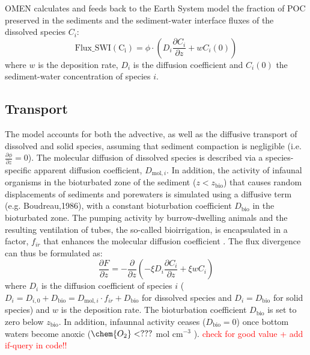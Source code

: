\documentclass[gmd, manuscript]{copernicus}
\begin{document}
OMEN calculates and feeds back to the Earth System model the fraction of POC preserved in the sediments and the sediment-water interface fluxes of the dissolved species $C_i$:
\begin{equation}
\mathrm{Flux\_SWI(C_i)} = \phi \cdot \left(D_i \frac{\partial C_i}{\partial z} + w C_i(0) \right)
\end{equation}
where $w$ is the deposition rate, $D_i$ is the diffusion coefficient and $C_i(0)$ the sediment-water concentration of species $i$. 

\subsection{Transport}\label{subsec:Transport}
The model accounts for both the advective, as well as the diffusive transport of dissolved and solid species, assuming that sediment compaction is negligible (i.e. $\frac{\partial \phi}{\partial z}=0$). 
The molecular diffusion of dissolved species is described via a species-specific apparent diffusion coefficient, $D_{\mathrm{mol},i}$. 
In addition, the activity of infaunal organisms in the bioturbated zone of the sediment ($z<z_{\mathrm{bio}}$) that causes random 
displacements of sediments and porewaters is simulated using a diffusive term (e.g. Boudreau,1986), with a constant bioturbation coefficient $D_{\mathrm{bio}}$ in the bioturbated zone. 
The pumping activity by burrow-dwelling animals and the resulting ventilation of tubes, the so-called bioirrigation, is encapsulated in a factor, $f_{ir}$ that enhances the molecular diffusion coefficient 
\citep[ hence, $D_{i,0}=D_{\mathrm{mol},i}\cdot f_{ir}$,][]{soetaert1996dynamic}. The flux divergence can thus be formulated as:
\begin{equation}
\frac{\partial F}{\partial z}=-\frac{\partial}{\partial z}\left( -\xi D_i \frac{\partial C_i}{\partial z} +\xi w C_i\right) \label{Eq_flux_divergence}
\end{equation}
where $D_i$ is the diffusion coefficient of species $i$ ($D_i=D_{i,0}+D_{\mathrm{bio}}=D_{\mathrm{mol},i}\cdot f_{ir}+D_{\mathrm{bio}}$ for dissolved species and $D_i=D_{\mathrm{bio}}$ for solid species) and $w$ is the 
deposition rate. 
The bioturbation coefficient $D_{\mathrm{bio}}$ is set to zero below $z_{\mathrm{bio}}$. In addition, infaunnal activity ceases ($D_{\mathrm{bio}}=0$) once bottom waters become anoxic ($\chem{O_2} < ???$ mol cm$^{-3}$ ). 
\textcolor{red}{check for good value + add if-query in code!!}
\end{document}
